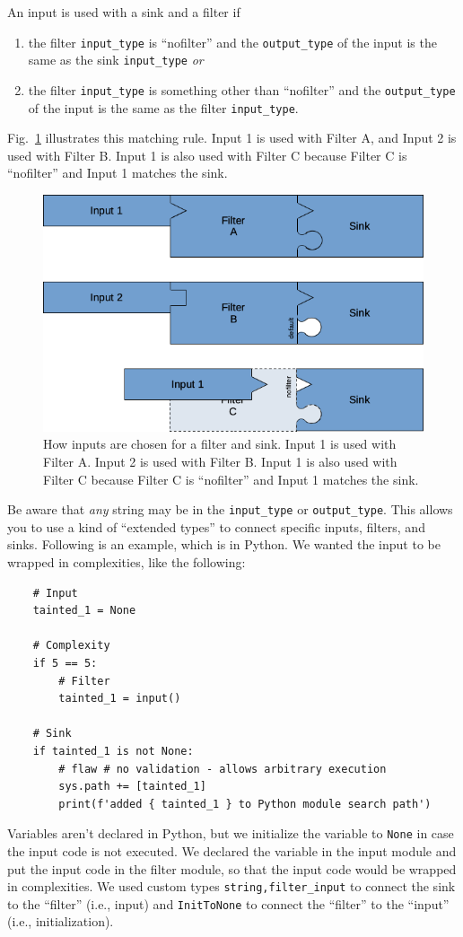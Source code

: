 An input is used with a sink and a filter if
\begin{enumerate}[nosep]
\item the filter \verb|input_type| is ``nofilter'' and the \verb|output_type|
  of the input is the same as the sink \verb|input_type| \emph{or}
\item the filter \verb|input_type| is something other than ``nofilter'' and the
  \verb|output_type| of the input is the same as the filter \verb|input_type|.
\end{enumerate}
Fig.~\ref{fig:how inputs fit} illustrates this matching rule.  Input 1 is used with
Filter A, and Input 2 is used with Filter B.  Input 1 is also used with Filter C
because Filter C is ``nofilter'' and Input 1 matches the sink.
\begin{figure}[tbp]
  \centerline{\includegraphics[width=.667\linewidth]{fig_inputs_filters_and_sinks.png}}
  \caption{How inputs are chosen for a filter and sink.  Input 1 is used with
    Filter A.  Input 2 is used with Filter B.  Input 1 is also used with Filter C
    because Filter C is ``nofilter'' and Input 1 matches the sink.
  }
  \label{fig:how inputs fit}
\end{figure}

Be aware that \emph{any} string may be in the \verb|input_type| or
\verb|output_type|.
This allows you to use a kind of ``extended types'' to connect specific inputs,
filters, and sinks.  Following is an example, which is in Python.
We wanted the input to be wrapped in
complexities, like the following:
\begin{verbatim}
    # Input
    tainted_1 = None

    # Complexity
    if 5 == 5:
        # Filter
        tainted_1 = input()

    # Sink
    if tainted_1 is not None:
        # flaw # no validation - allows arbitrary execution
        sys.path += [tainted_1]
        print(f'added { tainted_1 } to Python module search path')
\end{verbatim}
Variables aren't declared in Python, but we initialize the variable to \verb|None| in
case the input code is not executed.  We declared the variable in the input
module and put the input code in the filter module, so that the input code would be
wrapped in complexities.  We used custom types \verb|string,filter_input| to connect
the sink to the ``filter'' (i.e., input) and \verb|InitToNone| to connect the
``filter'' to the ``input'' (i.e., initialization).

